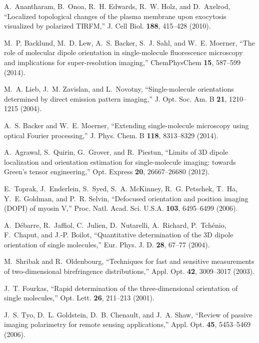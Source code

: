 \documentclass[10pt]{article}
\begin{document}
\begin{thebibliography}{10}
A.~Anantharam, B.~Onoa, R.~H. Edwards, R.~W. Holz, and D.~Axelrod,
  \enquote{Localized topological changes of the plasma membrane upon exocytosis
  visualized by polarized {TIRFM},} J. Cell Biol. \textbf{188}, 415--428
  (2010).

M.~P. Backlund, M.~D. Lew, A.~S. Backer, S.~J. Sahl, and W.~E. Moerner,
  \enquote{The role of molecular dipole orientation in single-molecule
  fluorescence microscopy and implications for super-resolution imaging,}
  ChemPhysChem \textbf{15}, 587--599 (2014).

M.~A. Lieb, J.~M. Zavislan, and L.~Novotny, \enquote{Single-molecule
  orientations determined by direct emission pattern imaging,} J. Opt. Soc. Am.
  B \textbf{21}, 1210--1215 (2004).

A.~S. Backer and W.~E. Moerner, \enquote{Extending single-molecule microscopy
  using optical {F}ourier processing,} J. Phys. Chem. B \textbf{118},
  8313--8329 (2014).

A.~Agrawal, S.~Quirin, G.~Grover, and R.~Piestun, \enquote{Limits of 3{D}
  dipole localization and orientation estimation for single-molecule imaging:
  towards {G}reen's tensor engineering,} Opt. Express \textbf{20}, 26667--26680
  (2012).

E.~Toprak, J.~Enderlein, S.~Syed, S.~A. McKinney, R.~G. Petschek, T.~Ha, Y.~E.
  Goldman, and P.~R. Selvin, \enquote{Defocused orientation and position
  imaging ({DOPI}) of myosin {V},} Proc. Natl. Acad. Sci. U.S.A. \textbf{103}, 6495--6499 (2006).

A.~D{\'e}barre, R.~Jaffiol, C.~Julien, D.~Nutarelli, A.~Richard,
  P.~Tch{\'e}nio, F.~Chaput, and J.-P. Boilot, \enquote{Quantitative
  determination of the 3{D} dipole orientation of single molecules,} Eur. Phys.
  J. D. \textbf{28}, 67--77 (2004).

M.~Shribak and R.~Oldenbourg, \enquote{Techniques for fast and sensitive
  measurements of two-dimensional birefringence distributions,} Appl. Opt.
  \textbf{42}, 3009--3017 (2003).

J.~T. Fourkas, \enquote{Rapid determination of the three-dimensional
  orientation of single molecules,} Opt. Lett. \textbf{26}, 211--213 (2001).

J.~S. Tyo, D.~L. Goldstein, D.~B. Chenault, and J.~A. Shaw, \enquote{Review of
  passive imaging polarimetry for remote sensing applications,} Appl. Opt.
  \textbf{45}, 5453--5469 (2006).


\end{thebibliography}
\end{document}
